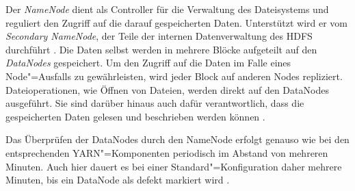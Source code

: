 Der \emph{NameNode} dient als Controller für die Verwaltung des Dateisystems und reguliert den Zugriff auf die darauf gespeicherten Daten.
Unterstützt wird er vom \emph{Secondary NameNode}, der Teile der internen Datenverwaltung des HDFS durchführt \cite{HadoopHdfsGuide271}.
Die Daten selbst werden in mehrere Blöcke aufgeteilt auf den \emph{DataNodes} gespeichert.
Um den Zugriff auf die Daten im Falle eines Node"=Ausfalls zu gewährleisten, wird jeder Block auf anderen Nodes repliziert.
Dateioperationen, wie \zB Öffnen von Dateien, werden direkt auf den DataNodes ausgeführt.
Sie sind darüber hinaus auch dafür verantwortlich, dass die gespeicherten Daten gelesen und beschrieben werden können \cite{Shvachko2010,HadoopHdfsDesc271}.

Das Überprüfen der DataNodes durch den NameNode erfolgt genauso wie bei den entsprechenden YARN"=Komponenten periodisch im Abstand von mehreren Minuten.
Auch hier dauert es bei einer Standard"=Konfiguration daher mehrere Minuten, bis ein DataNode als defekt markiert wird \cite{HadoopHdfsConfig271}.
